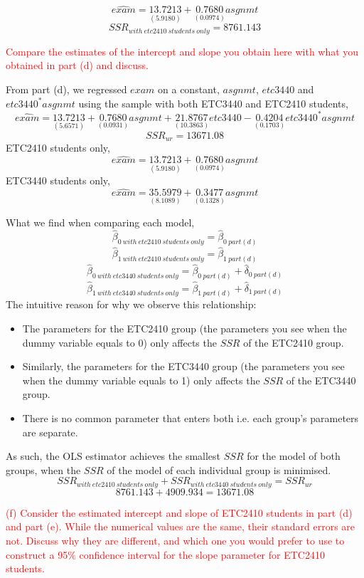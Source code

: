 \documentclass[12pt]{report}
\begin{document}
\vspace{-\baselineskip}
$$\widehat{exam} = \underset{(5.9180)}{13.7213} + \underset{(0.0974)}{0.7680}asgnmt$$
$$SSR_{with\ etc2410\ students\ only} = 8761.143$$

\noindent \textcolor{red}
{
	Compare the estimates of the intercept and slope you obtain here with what you obtained in part (d) and discuss.
}

\noindent From part (d), we regressed $exam$ on a constant, $asgnmt$, $etc3440$ and $etc3440^*asgnmt$ using the sample with both ETC3440 and ETC2410 students,
$$\widehat{exam} = \underset{(5.6571)}{13.7213} + \underset{(0.0931)}{0.7680}asgnmt + \underset{(10.3863)}{21.8767}etc3440 - \underset{(0.1703)}{0.4204}etc3440^*asgnmt$$
$$SSR_{ur} = 13671.08$$
\noindent ETC2410 students only,
$$\widehat{exam} = \underset{(5.9180)}{13.7213} + \underset{(0.0974)}{0.7680}asgnmt$$
\noindent ETC3440 students only,
$$\widehat{exam} = \underset{(8.1089)}{35.5979} + \underset{(0.1328)}{0.3477}asgnmt$$

\noindent What we find when comparing each model,
$$\hat{\beta}_{0\ with\ etc2410\ students\ only} = \hat{\beta}_{0\ part(d)}$$
$$\hat{\beta}_{1\ with\ etc2410\ students\ only} = \hat{\beta}_{1\ part(d)}$$
$$\hat{\beta}_{0\ with\ etc3440\ students\ only} = \hat{\beta}_{0\ part(d)} + \hat{\delta}_{0\ part(d)}$$
$$\hat{\beta}_{1\ with\ etc3440\ students\ only} = \hat{\beta}_{1\ part(d)} + \hat{\delta}_{1\ part(d)}$$
\noindent The intuitive reason for why we observe this relationship: 
\begin{itemize}
	\item The parameters for the ETC2410 group (the parameters you see when the dummy variable equals to 0) only affects the $SSR$ of the ETC2410 group.
	\item Similarly, the parameters for the ETC3440 group (the parameters you see when the dummy variable equals to 1) only affects the $SSR$ of the ETC3440 group.
	\item There is no common parameter that enters both i.e. each group's parameters are separate.
\end{itemize}
\noindent As such, the OLS estimator achieves the smallest $SSR$ for the model of both groups, when the $SSR$ of the model of each individual group is minimised.
$$SSR_{with\ etc2410\ students\ only} + SSR_{with\ etc3440\ students\ only} = SSR_{ur}$$
$$8761.143 + 4909.934 = 13671.08$$

\newpage
\noindent \textcolor{red}{(f) Consider the estimated intercept and slope of ETC2410 students in part (d) and part (e). While the numerical values are the same, their standard errors are not. Discuss why they are different, and which one you would prefer to use to construct a 95\% confidence interval for the slope parameter for ETC2410 students.}
\end{document}
